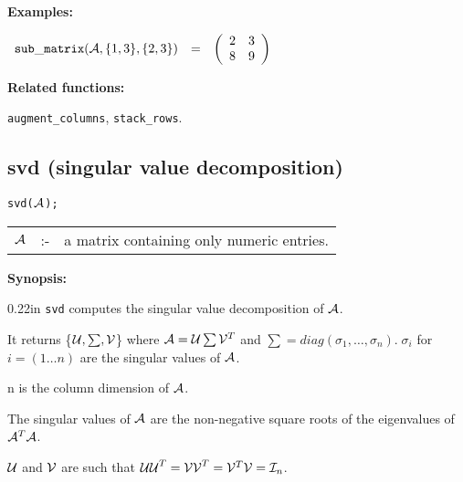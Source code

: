 {\bf Examples:}

\begin{flushleft}
\hspace*{0.1in}
\begin{math}
\begin{array}{ccc}
{\tt sub\_matrix}({\cal A},\{1,3\},\{2,3\}) & = &
        \left( \begin{array}{cc} 2 & 3 \\ 8 & 9
 \end{array} \right)
\end{array}
\end{math}
\end{flushleft}

{\bf Related functions:}

\hspace*{0.175in} {\tt augment\_columns}, {\tt stack\_rows}.


\subsection{svd (singular value decomposition)}


\hspace*{0.175in} {\tt svd(${\cal A}$);}

\hspace*{0.1in}
\begin{tabular}{l l l}
${\cal A}$ &:-& a matrix containing only numeric entries.
\end{tabular}

{\bf Synopsis:} %

\begin{addtolength}{\leftskip}{0.22in}
{\tt svd} computes the singular value decomposition of ${\cal A}$.

It returns \{${\cal U},\sum,{\cal V}$\} where ${\cal A} = {\cal U}
\sum {\cal V}^T$ and $\sum = diag(\sigma_{1}, \ldots ,\sigma_{n}). \;
\sigma_{i}$ for $i= (1 \ldots n)$ are the singular values of ${\cal A}$.


n is the column dimension of ${\cal A}$.

The singular values of ${\cal A}$ are the non-negative square roots of
the eigenvalues of ${\cal A}^T {\cal A}$.

${\cal U}$ and ${\cal V}$ are such that ${\cal UU}^T = {\cal VV}^T =
{\cal V}^T {\cal V} = {\cal I}_n$.

\end{addtolength}

